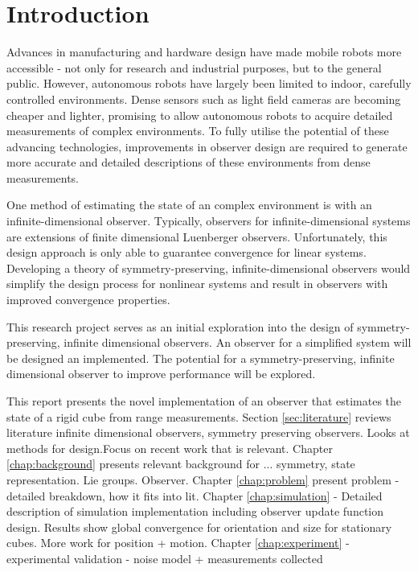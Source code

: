 \chapter{Introduction}

Advances in manufacturing and hardware design have made mobile robots more accessible - not only for research and industrial purposes, but to the general public. However, autonomous robots have largely been limited to indoor, carefully controlled environments. Dense sensors such as light field cameras are becoming cheaper and lighter, promising to allow autonomous robots to acquire detailed measurements of complex environments. To fully utilise the potential of these advancing technologies,  improvements in observer design are required to generate more accurate and detailed descriptions of these environments from dense measurements.

One method of estimating the state of an complex environment is with an infinite-dimensional observer. Typically, observers for infinite-dimensional systems are extensions of finite dimensional Luenberger observers. Unfortunately, this design approach is only able to guarantee convergence for linear systems. Developing a theory of symmetry-preserving, infinite-dimensional observers would simplify the design process for nonlinear systems and result in observers with improved convergence properties.

This research project serves as an initial exploration into the design of symmetry-preserving, infinite dimensional observers. An observer for a simplified system will be designed an implemented. The potential for a symmetry-preserving, infinite dimensional observer to improve performance will be explored. 

This report presents the novel implementation of an observer that estimates the state of a rigid cube from range measurements. Section \ref{sec:literature} reviews literature infinite dimensional observers, symmetry preserving observers. Looks at methods for design.Focus on recent work that is relevant. 
Chapter \ref{chap:background} presents relevant background for ... symmetry, state representation. Lie groups. Observer.
Chapter \ref{chap:problem} present problem - detailed breakdown, how it fits into lit. 
Chapter \ref{chap:simulation} - Detailed description of simulation implementation including observer update function design. Results show global convergence for orientation and size for stationary cubes. More work for position + motion.
Chapter \ref{chap:experiment} - experimental validation - noise model + measurements collected


